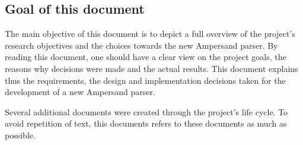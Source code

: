 
\subsection{Goal of this document}
The main objective of this document is to depict a full overview of the project's research objectives and the choices towards the new Ampersand parser.
By reading this document, one should have a clear view on the project goals, the reasons why decisions were made and the actual results.
This document explains thus the requirements, the design and implementation decisions taken for the development of a new Ampersand parser.

Several additional documents were created through the project's life cycle.
To avoid repetition of text, this documents refers to these documents as much as possible.
